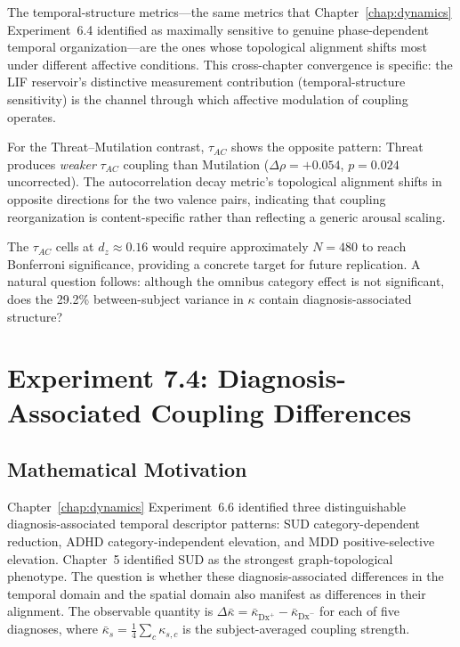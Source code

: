 The temporal-structure metrics---the same metrics that Chapter~\ref{chap:dynamics} Experiment~6.4 identified as maximally sensitive to genuine phase-dependent temporal organization---are the ones whose topological alignment shifts most under different affective conditions. This cross-chapter convergence is specific: the LIF reservoir's distinctive measurement contribution (temporal-structure sensitivity) is the channel through which affective modulation of coupling operates.

For the Threat--Mutilation contrast, $\tau_{AC}$ shows the opposite pattern: Threat produces \emph{weaker} $\tau_{AC}$ coupling than Mutilation ($\Delta\rho = +0.054$, $p = 0.024$ uncorrected). The autocorrelation decay metric's topological alignment shifts in opposite directions for the two valence pairs, indicating that coupling reorganization is content-specific rather than reflecting a generic arousal scaling.

The $\tau_{AC}$ cells at $d_z \approx 0.16$ would require approximately $N = 480$ to reach Bonferroni significance, providing a concrete target for future replication. A natural question follows: although the omnibus category effect is not significant, does the 29.2\% between-subject variance in $\kappa$ contain diagnosis-associated structure?


\section{Experiment 7.4: Diagnosis-Associated Coupling Differences}
\label{sec:exp7_diagnosis}

\subsection{Mathematical Motivation}

Chapter~\ref{chap:dynamics} Experiment~6.6 identified three distinguishable diagnosis-associated temporal descriptor patterns: SUD category-dependent reduction, ADHD category-independent elevation, and MDD positive-selective elevation. Chapter~5 identified SUD as the strongest graph-topological phenotype. The question is whether these diagnosis-associated differences in the temporal domain and the spatial domain also manifest as differences in their alignment. The observable quantity is $\Delta\bar{\kappa} = \bar{\kappa}_{\text{Dx}^+} - \bar{\kappa}_{\text{Dx}^-}$ for each of five diagnoses, where $\bar{\kappa}_s = \frac{1}{4}\sum_c \kappa_{s,c}$ is the subject-averaged coupling strength.

